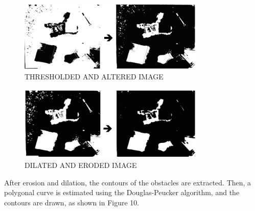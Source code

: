 \documentclass[twocolumn,10pt]{asme2e}
\begin{document}


\begin{figure}[t]
\begin{center}
\includegraphics[width=3.5in]{thresholded}
\caption{THRESHOLDED AND ALTERED IMAGE}
\label{default}
\end{center}
\end{figure}

\begin{figure}[t]
\begin{center}
\includegraphics[width=3.5in]{dilated}
\caption{DILATED AND ERODED IMAGE}
\label{default}
\end{center}
\end{figure}


After erosion and dilation, the contours of the obstacles are extracted. Then, a polygonal curve is estimated using the Douglas-Peucker algorithm, and the contours are drawn, as shown in Figure 10. 

\end{document}
